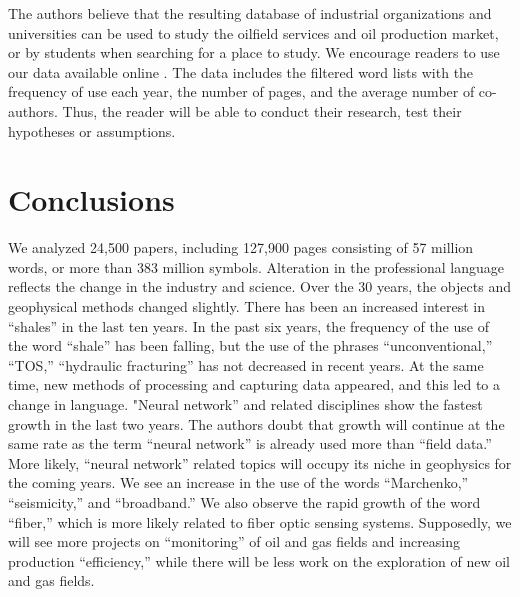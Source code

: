 \documentclass[geosciences,article,submit,moreauthors,pdftex]{Definitions/mdpi}
\begin{document}
The authors believe that the resulting database of industrial organizations and universities can be used to study the oilfield services and oil production market, or by students when searching for a place to study. We encourage readers to use our data available online \citep{Eltsov2020}. The data includes the filtered word lists with the frequency of use each year, the number of pages, and the average number of co-authors. Thus, the reader will be able to conduct their research, test their hypotheses or assumptions.



\section{Conclusions}

We analyzed 24,500 papers, including 127,900 pages consisting of 57 million words, or more than 383 million symbols. Alteration in the professional language reflects the change in the industry and science. Over the 30 years, the objects and geophysical methods changed slightly. There has been an increased interest in ``shales'' in the last ten years. In the past six years, the frequency of the use of the word ``shale'' has been falling, but the use of the phrases ``unconventional,'' ``TOS,'' ``hydraulic fracturing'' has not decreased in recent years. At the same time, new methods of processing and capturing data appeared, and this led to a change in language. "Neural network'' and related disciplines show the fastest growth in the last two years. The authors doubt that growth will continue at the same rate as the term ``neural network'' is already used more than ``field data.'' More likely, ``neural network'' related topics will occupy its niche in geophysics for the coming years. We see an increase in the use of the words ``Marchenko,'' ``seismicity,'' and ``broadband.'' We also observe the rapid growth of the word ``fiber,'' which is more likely related to fiber optic sensing systems. Supposedly, we will see more projects on ``monitoring'' of oil and gas fields and increasing production ``efficiency,'' while there will be less work on the exploration of new oil and gas fields.
 

\vspace{6pt} 

\end{document}
